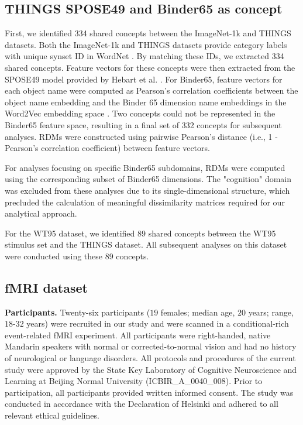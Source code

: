 \documentclass[pdflatex,sn-mathphys-num,lineno]{sn-jnl}%
\begin{document}
\begin{CJK}{UTF8}{gbsn}
\subsection{THINGS SPOSE49 and Binder65 as concept}
First, we identified 334 shared concepts between the ImageNet-1k and THINGS datasets. Both the ImageNet-1k and THINGS datasets provide category labels with unique synset ID in WordNet \cite{fellbaum_wordnet_1998}. By matching these IDs, we extracted 334 shared concepts. Feature vectors for these concepts were then extracted from the SPOSE49 model provided by Hebart et al. \cite{hebart_revealing_2020}. For Binder65, feature vectors for each object name were computed as Pearson’s correlation coefficients between the object name embedding and the Binder 65 dimension name embeddings in the Word2Vec embedding space \cite{grand_semantic_2022}. Two concepts could not be represented in the Binder65 feature space, resulting in a final set of 332 concepts for subsequent analyses. RDMs were constructed using pairwise Pearson's distance (i.e., 1 - Pearson's correlation coefficient) between feature vectors. 

For analyses focusing on specific Binder65 subdomains, RDMs were computed using the corresponding subset of Binder65 dimensions. The "cognition" domain was excluded from these analyses due to its single-dimensional structure, which precluded the calculation of meaningful dissimilarity matrices required for our analytical approach.

For the WT95 dataset, we identified 89 shared concepts between the WT95 stimulus set and the THINGS dataset. All subsequent analyses on this dataset were conducted using these 89 concepts.

\subsection{fMRI dataset} 
\textbf{Participants.} Twenty-six participants ($19$ females; median age, $20$ years; range, $18$-$32$ years) were recruited in our study and were scanned in a conditional-rich event-related fMRI experiment. All participants were right-handed, native Mandarin speakers with normal or corrected-to-normal vision and had no history of neurological or language disorders. All protocols and procedures of the current study were approved by the State Key Laboratory of Cognitive Neuroscience and Learning at Beijing Normal University (ICBIR\_A\_0040\_008). Prior to participation, all participants provided written informed consent. The study was conducted in accordance with the Declaration of Helsinki and adhered to all relevant ethical guidelines.


\end{CJK}
\end{document}

